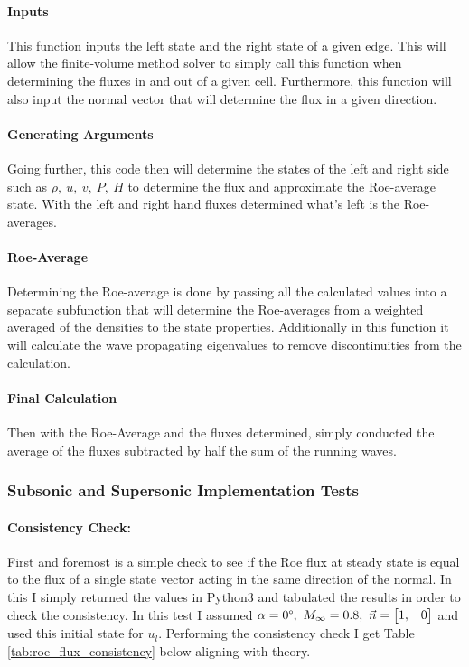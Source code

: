 \paragraph{Inputs} This function inputs the left state and the right state of a given edge. This will allow the finite-volume method solver to simply call this function when determining the fluxes in and out of a given cell. Furthermore, this function will also input the normal vector that will determine the flux in a given direction.

\paragraph{Generating Arguments} Going further, this code then will determine the states of the left and right side such as $\rho,\ u,\ v,\ P,\ H$ to determine the flux and approximate the Roe-average state. With the left and right hand fluxes determined what's left is the Roe-averages.

\paragraph{Roe-Average} Determining the Roe-average is done by passing all the calculated values into a separate subfunction that will determine the Roe-averages from a weighted averaged of the densities to the state properties. Additionally in this function it will calculate the wave propagating eigenvalues to remove discontinuities from the calculation.

\paragraph{Final Calculation} Then with the Roe-Average and the fluxes determined, simply conducted the average of the fluxes subtracted by half the sum of the running waves.\cite{notes:gryphon}

\pagebreak
\subsubsection{Subsonic and Supersonic Implementation Tests}

\paragraph{Consistency Check:} First and foremost is a simple check to see if the Roe flux at steady state is equal to the flux of a single state vector acting in the same direction of the normal. In this I simply returned the values in Python3 and tabulated the results in order to check the consistency. In this test I assumed $\alpha = 0\degree,\ M_\infty = 0.8,\ \vec{n} = \begin{bmatrix} 1, & 0 \end{bmatrix}$ and used this initial state for $u_l$. Performing the consistency check I get Table \ref{tab:roe_flux_consistency} below aligning with theory.

